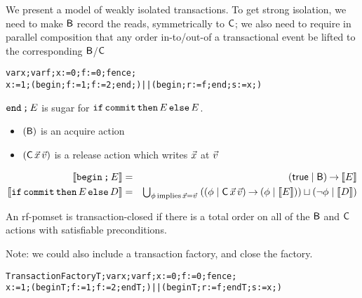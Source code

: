 We present a model of weakly isolated transactions.  To get strong isolation,
we need to make $\mathsf{B}$ record the reads, symmetrically to $\DC{}{}$; we also need
to require in parallel composition that any order in-to/out-of a
transactional event be lifted to the corresponding $\mathsf{B}$/$\DC{}{}$

\begin{alltt}
  var x; var f; x:=0; f:=0; fence; 
     x:=1; (begin; f:=1; f:=2; end;) || (begin; r:=f; end; s:=x;)
\end{alltt}
$\texttt{end}\,\texttt{;}\, E$ is sugar for $\texttt{if\,commit\,then}\, E \,\texttt{else}\, E$.

\begin{itemize}
\item $(\mathsf{B})$ is an acquire action
\item %
  $(\DC{\vec\aLoc}{\vec\aVal})$
  is a release action which writes $\vec{x}$ at $\vec{v}$
\end{itemize}

\begin{eqnarray*}
  \sem{\BEGIN\SEMI \aCmd}
  & = & (\TRUE \mid \DB) \prefix \sem{\aCmd}
  \\
  \sem{\IFCOMMITTHEN \aCmd \ELSE \bCmd}
  & = & \textstyle\bigcup_{\aForm\,\text{implies}\,\vec\aLoc=\vec\aVal}\;
        ((\aForm \mid \DC{\vec\aLoc}{\vec\aVal}) \prefix (\aForm \mid \sem{\aCmd}))
        \sqcup  (\lnot\aForm \mid \sem{\bCmd})
\end{eqnarray*}

\begin{definition}
  An rf-pomset is transaction-closed if there is a total order on all of the
  $\mathsf{B}$ and $\DC{}{}$ actions with satisfiable preconditions.
\end{definition}
 
Note: we could also include a transaction factory, and close the factory.
\begin{alltt}
  TransactionFactory T; var x; var f; x:=0; f:=0; fence; 
     x:=1; (begin T; f:=1; f:=2; end T;) || (begin T; r:=f; end T; s:=x;)
\end{alltt}


